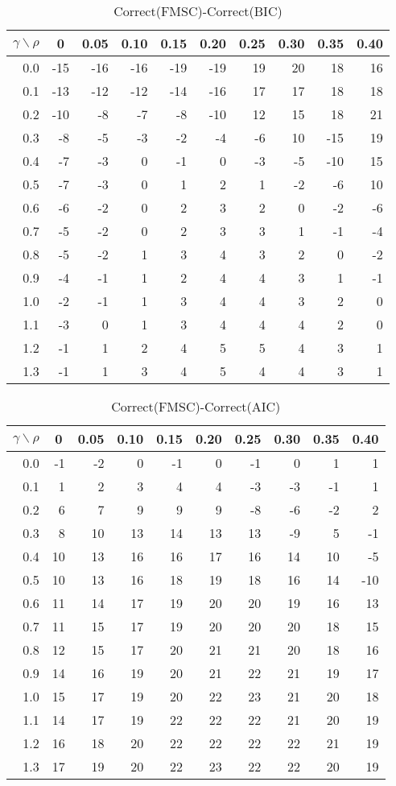 \documentclass[12pt]{article}
\begin{document}
%
\begin{table}[!tbp]
\caption{Correct(FMSC)-Correct(BIC)}
 \begin{center}
 \begin{tabular}{r|rrrrrrrrr}\hline\hline
\multicolumn{1}{c|}{$\gamma\backslash\rho$}&\multicolumn{1}{c}{0}&\multicolumn{1}{c}{0.05}&\multicolumn{1}{c}{0.10}&\multicolumn{1}{c}{0.15}&\multicolumn{1}{c}{0.20}&\multicolumn{1}{c}{0.25}&\multicolumn{1}{c}{0.30}&\multicolumn{1}{c}{0.35}&\multicolumn{1}{c}{0.40}\tabularnewline
\hline
0.0&-15&-16&-16&-19&-19&19&20& 18&16\tabularnewline
0.1&-13&-12&-12&-14&-16&17&17& 18&18\tabularnewline
0.2&-10& -8& -7& -8&-10&12&15& 18&21\tabularnewline
0.3& -8& -5& -3& -2& -4&-6&10&-15&19\tabularnewline
0.4& -7& -3&  0& -1&  0&-3&-5&-10&15\tabularnewline
0.5& -7& -3&  0&  1&  2& 1&-2& -6&10\tabularnewline
0.6& -6& -2&  0&  2&  3& 2& 0& -2&-6\tabularnewline
0.7& -5& -2&  0&  2&  3& 3& 1& -1&-4\tabularnewline
0.8& -5& -2&  1&  3&  4& 3& 2&  0&-2\tabularnewline
0.9& -4& -1&  1&  2&  4& 4& 3&  1&-1\tabularnewline
1.0& -2& -1&  1&  3&  4& 4& 3&  2& 0\tabularnewline
1.1& -3&  0&  1&  3&  4& 4& 4&  2& 0\tabularnewline
1.2& -1&  1&  2&  4&  5& 5& 4&  3& 1\tabularnewline
1.3& -1&  1&  3&  4&  5& 4& 4&  3& 1\tabularnewline
\hline
\end{tabular}

\end{center}

\end{table}

%
\begin{table}[!tbp]
\caption{Correct(FMSC)-Correct(AIC)}
 \begin{center}
 \begin{tabular}{r|rrrrrrrrr}\hline\hline
\multicolumn{1}{c|}{$\gamma\backslash\rho$}&\multicolumn{1}{c}{0}&\multicolumn{1}{c}{0.05}&\multicolumn{1}{c}{0.10}&\multicolumn{1}{c}{0.15}&\multicolumn{1}{c}{0.20}&\multicolumn{1}{c}{0.25}&\multicolumn{1}{c}{0.30}&\multicolumn{1}{c}{0.35}&\multicolumn{1}{c}{0.40}\tabularnewline
\hline
0.0&-1&-2& 0&-1& 0&-1& 0& 1&  1\tabularnewline
0.1& 1& 2& 3& 4& 4&-3&-3&-1&  1\tabularnewline
0.2& 6& 7& 9& 9& 9&-8&-6&-2&  2\tabularnewline
0.3& 8&10&13&14&13&13&-9& 5& -1\tabularnewline
0.4&10&13&16&16&17&16&14&10& -5\tabularnewline
0.5&10&13&16&18&19&18&16&14&-10\tabularnewline
0.6&11&14&17&19&20&20&19&16& 13\tabularnewline
0.7&11&15&17&19&20&20&20&18& 15\tabularnewline
0.8&12&15&17&20&21&21&20&18& 16\tabularnewline
0.9&14&16&19&20&21&22&21&19& 17\tabularnewline
1.0&15&17&19&20&22&23&21&20& 18\tabularnewline
1.1&14&17&19&22&22&22&21&20& 19\tabularnewline
1.2&16&18&20&22&22&22&22&21& 19\tabularnewline
1.3&17&19&20&22&23&22&22&20& 19\tabularnewline
\hline
\end{tabular}

\end{center}

\end{table}
\end{document}
